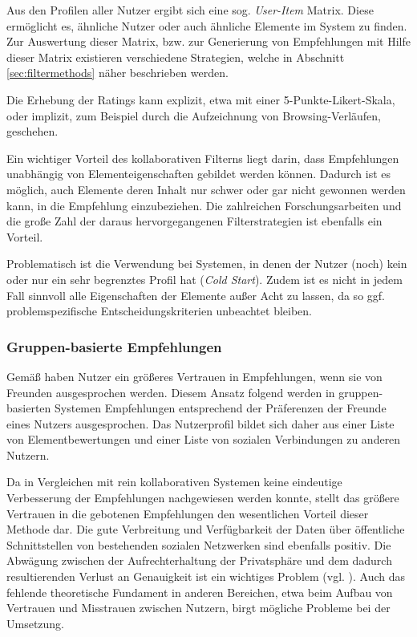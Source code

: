 Aus den Profilen aller Nutzer ergibt sich eine sog. \textit{User-Item} Matrix. Diese ermöglicht es, ähnliche Nutzer oder auch ähnliche Elemente im System zu finden. Zur Auswertung dieser Matrix, bzw. zur Generierung von Empfehlungen mit Hilfe dieser Matrix existieren verschiedene Strategien, welche in Abschnitt \ref{sec:filtermethods} näher beschrieben werden.

Die Erhebung der Ratings kann explizit, etwa mit einer 5-Punkte-Likert-Skala, oder implizit, zum Beispiel durch die Aufzeichnung von Browsing-Verläufen, geschehen.

Ein wichtiger Vorteil des kollaborativen Filterns liegt darin, dass Empfehlungen unabhängig von Elementeigenschaften gebildet werden können. Dadurch ist es möglich, auch Elemente deren Inhalt nur schwer oder gar nicht gewonnen werden kann, in die Empfehlung einzubeziehen. Die zahlreichen Forschungsarbeiten und die große Zahl der daraus hervorgegangenen Filterstrategien ist ebenfalls ein Vorteil.

Problematisch ist die Verwendung bei Systemen, in denen der Nutzer (noch) kein oder nur ein sehr begrenztes Profil hat (\textit{Cold Start}). Zudem ist es nicht in jedem Fall sinnvoll alle Eigenschaften der Elemente außer Acht zu lassen, da so ggf. problemspezifische Entscheidungskriterien unbeachtet bleiben.  \citep{hb,Burke:2002:HRS:586321.586352} %


\subsubsection{Gruppen-basierte Empfehlungen}\label{sec:cbf_overview}
Gemäß \citep{SinhaS01} haben Nutzer ein größeres Vertrauen in Empfehlungen, wenn sie von Freunden ausgesprochen werden. Diesem Ansatz folgend werden in gruppen-basierten Systemen Empfehlungen entsprechend der Präferenzen der Freunde eines Nutzers ausgesprochen. Das Nutzerprofil bildet sich daher aus einer Liste von Elementbewertungen und einer Liste von sozialen Verbindungen zu anderen Nutzern.

Da in Vergleichen mit rein kollaborativen Systemen keine eindeutige Verbesserung der Empfehlungen nachgewiesen werden konnte, stellt das größere Vertrauen in die gebotenen Empfehlungen den wesentlichen Vorteil dieser Methode dar. Die gute Verbreitung und Verfügbarkeit der Daten über öffentliche Schnittstellen von  bestehenden sozialen Netzwerken sind ebenfalls positiv. Die Abwägung zwischen der Aufrechterhaltung der Privatsphäre und dem dadurch resultierenden Verlust an Genauigkeit ist ein wichtiges Problem (vgl. \citep{machanavajjhala:accurate}). Auch das fehlende theoretische Fundament in anderen Bereichen, etwa beim Aufbau von Vertrauen und Misstrauen zwischen Nutzern, birgt mögliche Probleme bei der Umsetzung. \citep{hb_20}

